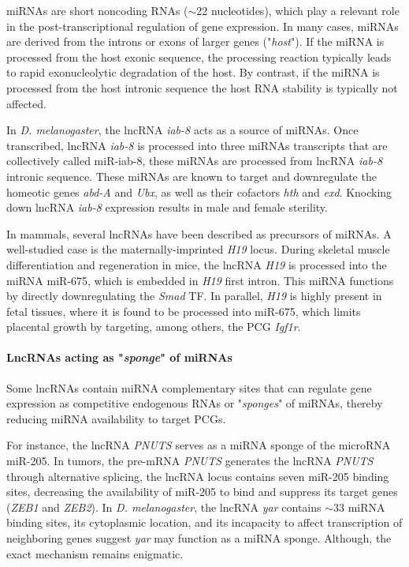 miRNAs are short noncoding RNAs ($\sim$22 nucleotides), which play a relevant role in the post-transcriptional regulation of gene expression.\autocite{siomi_2010_mirna} In many cases, miRNAs are derived from the introns or exons of larger genes ("\textit{host}"). If the miRNA is processed from the host exonic sequence, the processing reaction typically leads to rapid exonucleolytic degradation of the host. By contrast, if the miRNA is processed from the host intronic sequence the host RNA stability is typically not affected.\autocite{ulitsky_2018_interactions}

In \textit{D. melanogaster}, the lncRNA \textit{iab-8} acts as a source of miRNAs. Once transcribed, lncRNA \textit{iab-8} is processed into three miRNAs transcripts that are collectively called miR-iab-8, these miRNAs are processed from lncRNA \textit{iab-8} intronic sequence. These miRNAs are known to target and downregulate the homeotic genes \textit{abd-A} and \textit{Ubx}, as well as their cofactors \textit{hth} and \textit{exd}.\autocite{garaulet_2014_homeotic} Knocking down lncRNA \textit{iab-8} expression results in male and female sterility.\autocite{maeda_2018_lncrna}

In mammals, several lncRNAs have been described as precursors of miRNAs. A well-studied case is the maternally-imprinted \textit{H19} locus. During skeletal muscle differentiation and regeneration in mice, the lncRNA \textit{H19} is processed into the miRNA miR-675, which is embedded in \textit{H19} first intron. This miRNA functions by directly downregulating the \textit{Smad} TF.\autocite{kallen_2013_h19} In parallel, \textit{H19} is highly present in fetal tissues, where it is found to be processed into miR-675, which limits placental growth by targeting, among others, the PCG \textit{Igf1r}.\autocite{keniry_2012_h19} 

\paragraph{LncRNAs acting as "\textit{sponge}" of miRNAs}
\label{paragraph:lncRNA_mi_sponge}

Some lncRNAs contain miRNA complementary sites that can regulate gene expression as competitive endogenous RNAs or "\textit{sponges}" of miRNAs, thereby reducing miRNA availability to target PCGs.\autocite{cesana_2011_long,salmena_2011_cerna}

For instance, the lncRNA \textit{PNUTS} serves as a miRNA sponge of the microRNA miR-205. In tumors, the pre-mRNA \textit{PNUTS} generates the lncRNA \textit{PNUTS} through alternative splicing, the lncRNA locus contains seven miR-205 binding sites, decreasing the availability of miR-205 to bind and suppress its target genes (\textit{ZEB1} and \textit{ZEB2}).\autocite{grelet_2017_pnuts} In \textit{D. melanogaster}, the lncRNA \textit{yar} contains $\sim$33 miRNA binding sites, its cytoplasmic location, and its incapacity to affect transcription of neighboring genes suggest \textit{yar} may function as a miRNA sponge\autocite{soshnev_2011_yar}. Although, the exact mechanism remains enigmatic.

